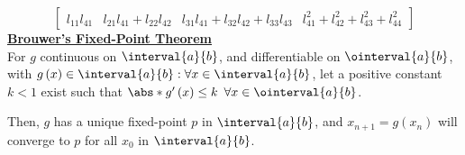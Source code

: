 \documentclass{article}
\begin{document}
\begin{minipage}[t]{126.1962963mm}
\begin{equation*}
\begin{bmatrix}
            l_{11} l_{41} & l_{21} l_{41}+l_{22} l_{42} & l_{31} l_{41}+l_{32} l_{42}+l_{33} l_{43} & l_{41}^2+l_{42}^2+l_{43}^2+l_{44}^2
        \end{bmatrix}
    \end{equation*}
    \underline{\textbf{Brouwer's Fixed-Point Theorem}} \\
    For \(g\) continuous on \(\interval{a}{b}\), and differentiable on \(\ointerval{a}{b}\), with \(g\left( x \right) \in \interval{a}{b} : \forall x \in \interval{a}{b}\),
    let a positive constant \(k < 1\) exist such that \(\abs*{g'\left( x \right)} \leq k\) \(\forall x \in \ointerval{a}{b}\).

    Then, \(g\) has a unique fixed-point \(p\) in \(\interval{a}{b}\), and \(x_{n+1} = g\left( x_n \right)\)
    will converge to \(p\) for all \(x_0\) in \(\interval{a}{b}\).
\end{minipage}
\end{document}
